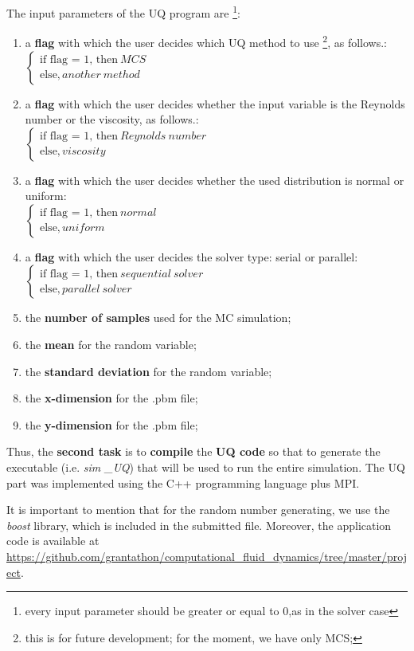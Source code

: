 \documentclass[12pt,a4paper]{article}
\begin{document}
The input parameters of the UQ program are \footnote{every input parameter should be greater or equal to 0,as in the solver case}:
\begin{enumerate}
\item {a \textbf{flag} with which the user decides which UQ method to use \footnote{this is for future development; for the moment, we have only MCS;}, as follows.}: \\
$\left\{
  \begin{array}{ccl}
    \text{if flag = 1, then} \ MCS \\
    \text{else}, another \ method 
  \end{array}
\right.$
\item {a \textbf{flag} with which the user decides whether the input variable is the Reynolds number or the viscosity, as follows.}: \\
$\left\{
  \begin{array}{ccl}
    \text{if flag = 1, then} \ Reynolds \ number \\
    \text{else}, viscosity 
  \end{array}
\right.$
\item {a \textbf{flag} with which the user decides whether the used distribution is normal or uniform}: \\
$\left\{
  \begin{array}{ccl}
    \text{if flag = 1, then} \ normal \\
    \text{else}, uniform 
  \end{array}
\right.$
\item {a \textbf{flag} with which the user decides the solver type: serial or parallel}: \\
$\left\{
  \begin{array}{ccl}
    \text{if flag = 1, then} \ sequential\ solver \\
    \text{else}, parallel\ solver
  \end{array}
\right.$
\item {the \textbf{number of samples} used for the MC simulation};
\item {the \textbf{mean} for the random variable};
\item {the \textbf{standard deviation} for the random variable};
\item {the \textbf{x-dimension} for the .pbm file};
\item {the \textbf{y-dimension} for the .pbm file};
\end{enumerate}
Thus, the \textbf{second task} is to \textbf{compile} the \textbf{UQ code} so that to generate the executable (i.e. \emph{sim \_UQ})  that will be used to run the entire simulation.
The UQ part was implemented using the C++ programming language plus MPI.

It is important to mention that for the random number generating, we use the \emph{boost} library, which is included in the submitted file. Moreover, the application code is available at \url{https://github.com/grantathon/computational_fluid_dynamics/tree/master/project}.
\end{document}
